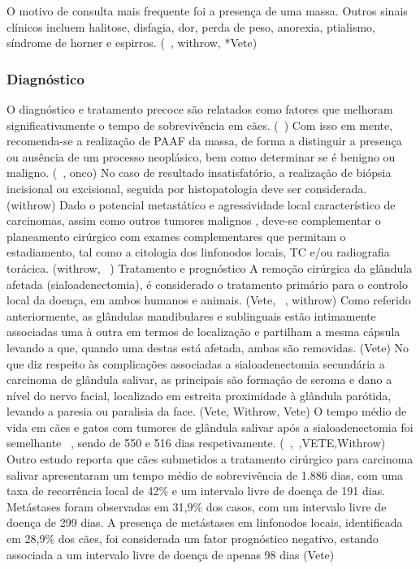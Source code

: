 O motivo de consulta mais frequente foi a presença de uma massa. Outros sinais clínicos incluem halitose, disfagia, dor, perda de peso, anorexia, ptialismo, síndrome de horner e espirros. (~\cite{Dobson2011}, withrow, *Vete) 


\subsubsection{Diagnóstico}



O diagnóstico e tratamento precoce são relatados como fatores que melhoram significativamente o tempo de sobrevivência em cães. (~\cite{Dobson2011}) Com isso em mente, recomenda-se a realização de PAAF da massa, de forma a distinguir a presença ou ausência de um processo neoplásico, bem como determinar se é benigno ou maligno. (~\cite{Dobson2011}, onco) No caso de resultado insatisfatório, a realização de biópsia incisional ou excisional, seguida por histopatologia deve ser considerada. (withrow) Dado o potencial metastático e agressividade local característico de carcinomas, assim como outros tumores malignos , deve-se complementar o planeamento cirúrgico com exames complementares que permitam o estadiamento, tal como a citologia dos linfonodos locais, TC e/ou radiografia torácica. (withrow, ~\cite{Dobson2011})
Tratamento e prognóstico
A remoção cirúrgica da glândula afetada (sialoadenectomia), é considerado o tratamento primário para o controlo local da doença, em ambos humanos e animais. (Vete, ~\cite{Dobson2011}, withrow) Como referido anteriormente, as glândulas mandibulares e sublinguais estão intimamente associadas uma à outra em termos de localização e partilham a mesma cápsula levando a que, quando uma destas está afetada, ambas são removidas. (Vete) 
No que diz respeito às complicações associadas a sialoadenectomia secundária a carcinoma de glândula salivar, as principais são formação de seroma e dano a nível do nervo facial, localizado em estreita proximidade à glândula parótida, levando a paresia ou paralisia da face. (Vete, Withrow, Vete)
O tempo médio de vida em cães e gatos com tumores de glândula salivar após a sialoadenectomia foi semelhante ~\cite{Han2016}, sendo de 550 e 516 dias respetivamente.  (~\cite{Hammer2001},~\cite{Dobson2011},VETE,Withrow) Outro estudo reporta que cães submetidos a tratamento cirúrgico para carcinoma salivar apresentaram um tempo médio de sobrevivência de 1.886 dias, com uma taxa de recorrência local de 42\% e um intervalo livre de doença de 191 dias. Metástases foram observadas em 31,9\% dos casos, com um intervalo livre de doença de 299 dias. A presença de metástases em linfonodos locais, identificada em 28,9\% dos cães, foi considerada um fator prognóstico negativo, estando associada a um intervalo livre de doença de apenas 98 dias (Vete)



